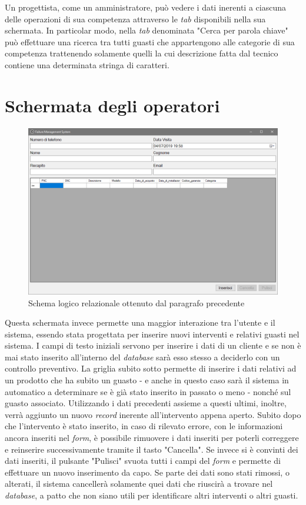\documentclass[a4paper, 12pt]{report}
\begin{document}
Un progettista, come un amministratore, può vedere i dati inerenti a ciascuna delle operazioni di sua competenza attraverso le \textit{tab} disponibili nella sua schermata. In particolar
modo, nella \textit{tab} denominata "Cerca per parola chiave" può effettuare una ricerca tra tutti guasti che appartengono alle categorie di sua competenza trattenendo solamente quelli
la cui descrizione fatta dal tecnico contiene una determinata stringa di caratteri.

\section{Schermata degli operatori}

\begin{figure}[H]
	\centering
	\includegraphics[width=\linewidth]{images/operatorScreen.png}
	\caption{Schema logico relazionale ottenuto dal paragrafo precedente}
\end{figure}

Questa schermata invece permette una maggior interazione tra l'utente e il sistema, essendo stata progettata per inserire nuovi interventi e relativi guasti nel sistema. I campi di 
testo iniziali servono per inserire i dati di un cliente e se non è mai stato inserito all'interno del \textit{database} sarà esso stesso a deciderlo con un controllo preventivo.
La griglia subito sotto permette di inserire i dati relativi ad un prodotto che ha subito un guasto - e anche in questo caso sarà il sistema in automatico a determinare se è già
stato inserito in passato o meno - nonché sul guasto associato. Utilizzando i dati precedenti assieme a questi ultimi, inoltre, verrà aggiunto un nuovo \textit{record} inerente
all'intervento appena aperto. Subito dopo che l'intervento è stato inserito, in caso di rilevato errore, con le informazioni ancora inseriti nel \textit{form}, è possibile rimuovere
i dati inseriti per poterli correggere e reinserire successivamente tramite il tasto "Cancella". Se invece si è convinti dei dati inseriti, il pulsante "Pulisci" svuota tutti i
campi del \textit{form} e permette di effettuare un nuovo inserimento da capo. Se parte dei dati sono stati rimossi, o alterati, il sistema cancellerà solamente quei dati che riuscirà
a trovare nel \textit{database}, a patto che non siano utili per identificare altri interventi o altri guasti.
\end{document}
